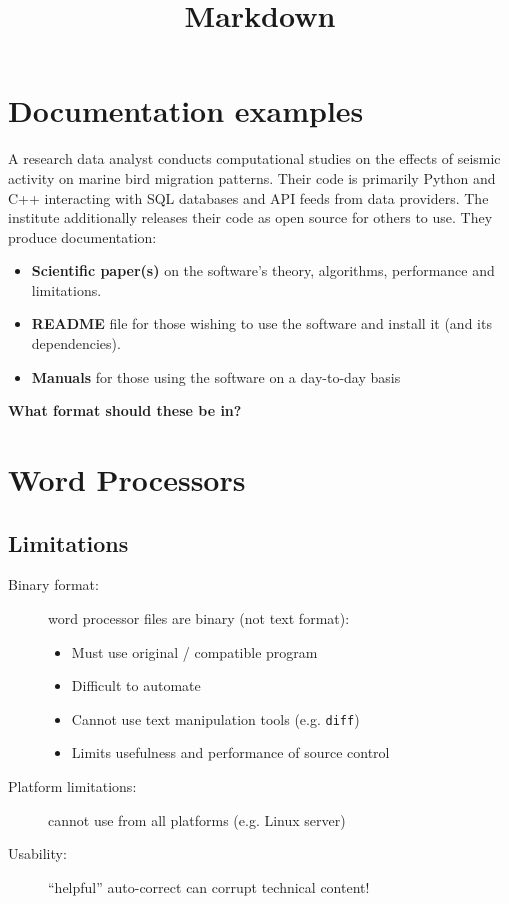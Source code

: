 \documentclass[slides]{pgnotes}
\title{Markdown}
\begin{document}
\maketitle

\tableofcontents

\section{Documentation examples}

A research data analyst conducts computational studies on the effects of seismic activity on marine bird migration patterns.
Their code is primarily Python and C++ interacting with SQL databases and API feeds from data providers.
The institute additionally releases their code as open source for others to use.
They produce documentation: 

\begin{itemize}

\item
  \textbf{Scientific paper(s)} on the software's theory, algorithms, performance and limitations.
  
\item
  \textbf{README} file for those wishing to use the software and install it (and its dependencies).

\item
  \textbf{Manuals} for those using the software on a day-to-day basis

\end{itemize}

\textbf{What format should these be in?}


\section{Word Processors}

\subsection{Limitations}

\begin{description}

\item[Binary format:] word processor files are binary (not text format):
  \begin{itemize}
  \item Must use original / compatible program
  \item Difficult to automate
  \item Cannot use text manipulation tools (e.g. \texttt{diff})
  \item Limits usefulness and performance of source control
  \end{itemize}
\item[Platform limitations:] cannot use from all platforms (e.g. Linux server)
\item[Usability:] ``helpful'' auto-correct can corrupt technical content!
  
\end{description}
\end{document}
